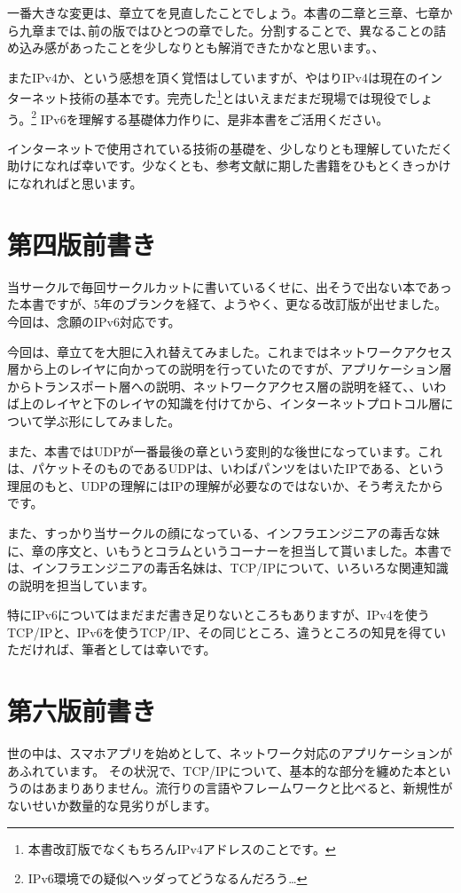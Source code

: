 一番大きな変更は、章立てを見直したことでしょう。本書の二章と三章、七章から九章までは､前の版ではひとつの章でした。分割することで、異なることの詰め込み感があったことを少しなりとも解消できたかなと思います。、

またIPv4か、という感想を頂く覚悟はしていますが、やはりIPv4は現在のインターネット技術の基本です。完売した\footnote{本書改訂版でなくもちろんIPv4アドレスのことです。}とはいえまだまだ現場では現役でしょう。\footnote{IPv6環境での疑似ヘッダってどうなるんだろう…}
IPv6を理解する基礎体力作りに、是非本書をご活用ください。

インターネットで使用されている技術の基礎を、少しなりとも理解していただく助けになれば幸いです。少なくとも、参考文献に期した書籍をひもとくきっかけになれればと思います。

\section*{第四版前書き}
当サークルで毎回サークルカットに書いているくせに、出そうで出ない本であった本書ですが、5年のブランクを経て、ようやく、更なる改訂版が出せました。今回は、念願のIPv6対応です。

今回は、章立てを大胆に入れ替えてみました。これまではネットワークアクセス層から上のレイヤに向かっての説明を行っていたのですが、アプリケーション層からトランスポート層への説明、ネットワークアクセス層の説明を経て、、いわば上のレイヤと下のレイヤの知識を付けてから、インターネットプロトコル層について学ぶ形にしてみました。

また、本書ではUDPが一番最後の章という変則的な後世になっています。これは、パケットそのものであるUDPは、いわばパンツをはいたIPである、という理屈のもと、UDPの理解にはIPの理解が必要なのではないか、そう考えたからです。

また、すっかり当サークルの顔になっている、インフラエンジニアの毒舌な妹に、章の序文と、いもうとコラムというコーナーを担当して貰いました。本書では、インフラエンジニアの毒舌名妹は、TCP/IPについて、いろいろな関連知識の説明を担当しています。


特にIPv6についてはまだまだ書き足りないところもありますが、IPv4を使うTCP/IPと、IPv6を使うTCP/IP、その同じところ、違うところの知見を得ていただければ、筆者としては幸いです。

\section*{第六版前書き}
世の中は、スマホアプリを始めとして、ネットワーク対応のアプリケーションがあふれています。
その状況で、TCP/IPについて、基本的な部分を纏めた本というのはあまりありません。流行りの言語やフレームワークと比べると、新規性がないせいか数量的な見劣りがします。

